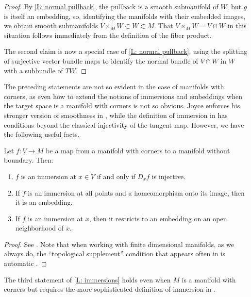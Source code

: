 \begin{proof}
	By \cref{L: normal pullback}, the pullback is a smooth submanifold of $W$, but $g$ is itself an embedding, so, identifying the manifolds with their embedded images, we obtain smooth submanifolds $V \times_MW \subset W \subset M$.
	That $V \times_MW = V \cap W$ in this situation follows immediately from the definition of the fiber product.

	The second claim is now a special case of \cref{L: normal pullback}, using the splitting of surjective vector bundle maps \cite[Theorem 3.9.6]{Hus75} to identify the normal bundle of $V \cap W$ in $W$ with a subbundle of $TW$. 
\end{proof}

The preceding statements are not so evident in the case of manifolds with corners, as even how to extend the notions of immersions and embeddings when the target space is a manifold with corners is not so obvious. Joyce enforces his stronger version of smoothness in \cite{Joy12}, while the definition of immersion in \cite[Section 3.2]{MaDo92} has conditions beyond the classical injectivity of the tangent map. However, we have the following useful facts.

\begin{lemma}\label{L: immersions}
	Let $f \colon V \to M$ be a map from a manifold with corners to a manifold without boundary.
	Then:
	\begin{enumerate}
		\item $f$ is an immersion at $x \in V$ if and only if $D_xf$ is injective.
		\item If $f$ is an immersion at all points and a homeomorphism onto its image, then it is an embedding.
		\item If $f$ is an immersion at $x$, then it restricts to an embedding on an open neighborhood of $x$.
	\end{enumerate}
\end{lemma}
\begin{proof}
	See \cite[Theorem 3.2.6, Proposition 3.2.13, and Definition 3.3.1]{MaDo92}. 
	Note that when working with finite dimensional manifolds, as we always do, the ``topological supplement'' condition that appears often in \cite{MaDo92} is automatic \cite[page 7]{MaDo92}.
\end{proof}

The third statement of \cref{L: immersions} holds even when $M$ is a manifold with corners but requires the more sophisticated definition of immersion in \cite{MaDo92}.


